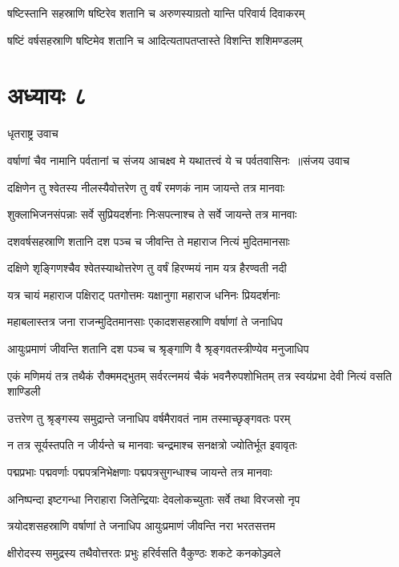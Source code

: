 \twolineshloka
{षष्टिस्तानि सहस्राणि षष्टिरेव शतानि च}
{अरुणस्याग्रतो यान्ति परिवार्य दिवाकरम्}


\twolineshloka
{षष्टिं वर्षसहस्राणि षष्टिमेव शतानि च}
{आदित्यतापतप्तास्ते विशन्ति शशिमण्डलम्}


\chapter{अध्यायः ८}
\twolineshloka
{धृतराष्ट्र उवाच}
{}


\threelineshloka
{वर्षाणां चैव नामानि पर्वतानां च संजय}
{आचक्ष्व मे यथातत्त्वं ये च पर्वतवासिनः ॥संजय उवाच}
{}


\twolineshloka
{दक्षिणेन तु श्वेतस्य नीलस्यैवोत्तरेण तु}
{वर्षं रमणकं नाम जायन्ते तत्र मानवाः}


\twolineshloka
{शुक्लाभिजनसंपन्नाः सर्वे सुप्रियदर्शनाः}
{निःसपत्नाश्च ते सर्वे जायन्ते तत्र मानवाः}


\twolineshloka
{दशवर्षसहस्राणि शतानि दश पञ्च च}
{जीवन्ति ते महाराज नित्यं मुदितमानसाः}


\twolineshloka
{दक्षिणे शृङ्गिणश्चैव श्वेतस्याथोत्तरेण तु}
{वर्षं हिरण्मयं नाम यत्र हैरण्वती नदी}


\twolineshloka
{यत्र चायं महाराज पक्षिराट् पतगोत्तमः}
{यक्षानुगा महाराज धनिनः प्रियदर्शनाः}


\twolineshloka
{महाबलास्तत्र जना राजन्मुदितमानसाः}
{एकादशसहस्राणि वर्षाणां ते जनाधिप}


\twolineshloka
{आयुःप्रमाणं जीवन्ति शतानि दश पञ्च च}
{श्रृङ्गाणि वै श्रृङ्गवतस्त्रीण्येव मनुजाधिप}


\threelineshloka
{एकं मणिमयं तत्र तथैकं रौक्ममद्भुतम्}
{सर्वरत्नमयं चैकं भवनैरुपशोभितम्}
{तत्र स्वयंप्रभा देवी नित्यं वसति शाण्डिली}


\twolineshloka
{उत्तरेण तु श्रृङ्गस्य समुद्रान्ते जनाधिप}
{वर्षमैरावतं नाम तस्माच्छृङ्गवतः परम्}


\twolineshloka
{न तत्र सूर्यस्तपति न जीर्यन्ते च मानवाः}
{चन्द्रमाश्च सनक्षत्रो ज्योतिर्भूत इवावृतः}


\twolineshloka
{पद्मप्रभाः पद्मवर्णाः पद्मपत्रनिभेक्षणाः}
{पद्मपत्रसुगन्धाश्च जायन्ते तत्र मानवाः}


\twolineshloka
{अनिष्पन्दा इष्टगन्धा निराहारा जितेन्द्रियाः}
{देवलोकच्युताः सर्वे तथा विरजसो नृप}


\twolineshloka
{त्रयोदशसहस्राणि वर्षाणां ते जनाधिप}
{आयुःप्रमाणं जीवन्ति नरा भरतसत्तम}


\twolineshloka
{क्षीरोदस्य समुद्रस्य तथैवोत्तरतः प्रभुः}
{हरिर्वसति वैकुण्ठः शकटे कनकोञ्ज्वले}


